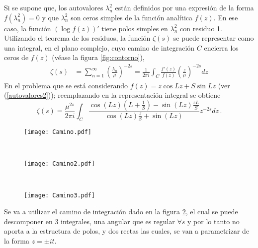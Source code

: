 Si se supone que, los autovalores $\lambda ^2 _n$ están definidos por una expresión de
la forma $f ( \lambda ^2 _ n ) = 0$ y que $\lambda ^2 _n$  son ceros simples de la función analítica $f (z)$.
En ese caso, la función $( \log f (z))'$ tiene polos simples en $\lambda ^2 _n$ con residuo 1.
Utilizando el teorema de los residuos, la función $\zeta (s)$ se puede representar
como una integral, en el plano complejo, cuyo camino de integración $C$
encierra los ceros de $f (z)$ (véase la figura \ref{fig:contorno}),
\begin{equation}
\begin{aligned}
   \zeta  (s) &=  \sum _{n=1} ^{\infty} \left( \frac{\lambda _n}{\mu} \right) ^{-2s} 
   =  
   \frac{1}{2 \pi i} \int _{C} \frac{f'(z)}{f(z)} \left( \frac{z}{\mu} \right) ^{-2s} dz 
\end{aligned}
\label{asd}
\end{equation}
En el problema que se está considerando $f(z) = z \cos Lz + S \sin Lz$ (ver (\ref{autovalores2})); reemplazando en la representación integral se obtiene
\begin{equation}
	\zeta  (s) = 
    \frac{\mu ^{2s}}{2 \pi i} \int _{C}
    \frac{ \cos (L z) \left(L + \frac{1}{S} \right) - \sin(L z) \frac{z L}{S}
    }
    { \cos(L z) \frac{z}{S} + \sin(L z)
    }
     z  ^{-2 s} dz  \, .
\end{equation}
\begin{figure*}[t!]
    \centering
    \begin{subfigure}[t]{0.3\textwidth}
        \centering
        \texttt{[image: Camino.pdf]}
        \caption{}
        \label{fig.izquierda_2}
    \end{subfigure}%
    ~ 
    \begin{subfigure}[t]{0.3\textwidth}
        \centering
        \texttt{[image: Camino2.pdf]}
        \caption{}
        \label{fig.medio}
    \end{subfigure}
    ~
    \begin{subfigure}[t]{0.3\textwidth}
        \centering
        \texttt{[image: Camino3.pdf]}
        \caption{}
        \label{fig.derecha.derecha}
    \end{subfigure}
    \caption{Estos caminos son los tenidos en cuenta para representar a la {\it función-$\zeta$} como una integral en el plano complejo.}
\label{fig:contorno}
\end{figure*}
Se va a utilizar el camino de integración dado en la figura \ref{fig.medio}, el cual se puede descomponer en 3 integrales, una angular que es regular $ \forall s$ y por lo tanto no aporta a la estructura de polos, y dos rectas las cuales, se van a parametrizar de la forma $z = \pm i  t$. 
